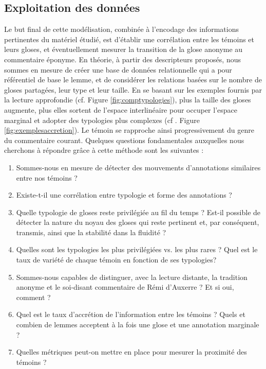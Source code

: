 \documentclass[a4paper, twoside, 12pt]{book}
\begin{document}
{\subsection{Exploitation des données}

Le but final de cette modélisation, combinée à l'encodage des informations pertinentes du matériel étudié, est d'établir une corrélation entre les témoins et leurs gloses, et éventuellement \og{}mesurer\fg{} la transition de la glose anonyme au commentaire éponyme. En théorie, à partir des descripteurs proposés, nous sommes en mesure de créer une base de données relationnelle qui a pour référentiel de base le lemme, et de considérer les relations basées sur le nombre de gloses partagées, leur type et leur taille. En se basant sur les exemples fournis par la lecture approfondie (cf. Figure \ref{fig:comptypologies}), plus la taille des gloses augmente, plus elles sortent de l'espace interlinéaire pour occuper l'espace marginal et adopter des typologies plus complexes (cf . Figure \ref{fig:exemplesaccretion}). Le témoin se rapproche ainsi progressivement du genre du commentaire courant. Quelques questions fondamentales auxquelles nous cherchons à répondre grâce à cette méthode sont les suivantes :

\begin{enumerate}
\item Sommes-nous en mesure de détecter des mouvements d'annotations similaires entre nos témoins ?
\item Existe-t-il une corrélation entre typologie et forme des annotations ?
\item Quelle typologie de gloses reste privilégiée au fil du temps ? Est-il possible de détecter la nature du \og{}noyau\fg{} des gloses qui reste pertinent et, par conséquent, transmis, ainsi que la stabilité dans la fluidité ?
\item Quelles sont les typologies les plus privilégiées vs. les plus rares ? Quel est le taux de variété de chaque témoin en fonction de ses typologies?
\item Sommes-nous capables de distinguer, avec la lecture distante, la tradition \og{}anonyme\fg{} et le soi-disant commentaire de Rémi d'Auxerre ? Et si oui, comment ?
\item Quel est le taux d'accrétion de l'information entre les témoins ? Quels et combien de lemmes acceptent à la fois une glose et une annotation marginale ?
\item Quelles métriques peut-on mettre en place pour mesurer la proximité des témoins ?
\end{enumerate}


}
\end{document}
